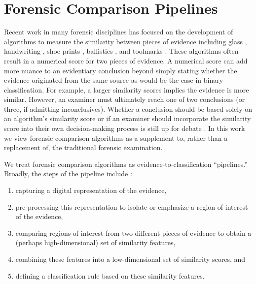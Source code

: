 \documentclass[11pt,]{isuthesis}
\begin{document}
\hypertarget{forensic-comparison-pipelines}{%
\section{Forensic Comparison Pipelines}\label{forensic-comparison-pipelines}}

Recent work in many forensic disciplines has focused on the development of algorithms to measure the similarity between pieces of evidence including glass \citep{Curran2000-hp, Park2019, openForSciR}, handwriting \citep{crawford_handwriting_2020}, shoe prints \citep{park_algorithm_2020}, ballistics \citep{hare_automatic_2016, tai_fully_2018}, and toolmarks \citep{Hadler2017, Krishnan2018}.
These algorithms often result in a numerical score for two pieces of evidence.
A numerical score can add more nuance to an evidentiary conclusion beyond simply stating whether the evidence originated from the same source as would be the case in binary classification.
For example, a larger similarity scores implies the evidence is more similar.
However, an examiner must ultimately reach one of two conclusions (or three, if admitting inconclusives).
Whether a conclusion should be based solely on an algorithm's similarity score or if an examiner should incorporate the similarity score into their own decision-making process is still up for debate \citep{Swofford2021}.
In this work we view forensic comparison algorithms as a supplement to, rather than a replacement of, the traditional forensic examination.

We treat forensic comparison algorithms as evidence-to-classification ``pipelines.''
Broadly, the steps of the pipeline include \citet{Rice2020}:

\begin{enumerate}
\def\labelenumi{\arabic{enumi}.}
\item
  capturing a digital representation of the evidence,
\item
  pre-processing this representation to isolate or emphasize a region of interest of the evidence,
\item
  comparing regions of interest from two different pieces of evidence to obtain a (perhaps high-dimensional) set of similarity features,
\item
  combining these features into a low-dimensional set of similarity scores, and
\item
  defining a classification rule based on these similarity features.
\end{enumerate}
\end{document}
